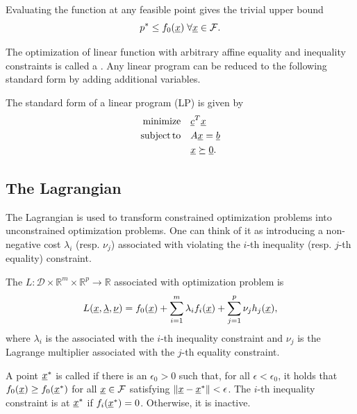 Evaluating the function at any feasible point gives the trivial upper bound
\[ p^* \leq f_0 (\underline{x}) \; \forall \underline{x}\in \mathcal{F}. \]

The optimization of linear function with arbitrary affine equality and inequality constraints is called a .
Any linear program can be reduced to the following standard form by adding additional variables.

\begin{definition}
The standard form of a linear program (LP) is given by
\begin{align*}
\mathrm{minimize} \quad & \underline{c}^T \underline{x} \\
\mathrm{subject\,to} \quad & A \underline{x} = \underline{b} \\
& \underline{x} \succeq \underline{0}.
\end{align*}
\end{definition}


\subsection{The Lagrangian}

The Lagrangian is used to transform constrained optimization problems into unconstrained optimization problems.
One can think of it as introducing a non-negative cost $\lambda_i$ (resp. $\nu_j$) associated with violating the $i$-th inequality (resp. $j$-th equality) constraint.

\begin{definition}
The  $L \colon \mathcal{D} \times \mathbb{R}^m \times \mathbb{R}^p \rightarrow \mathbb{R}$ associated with optimization problem is
\[ L(\underline{x},\underline{\lambda},\underline{\nu}) = f_0(\underline{x}) + \sum_{i=1}^m \lambda_i f_i(\underline{x}) + \sum_{j=1}^p \nu_j h_j(\underline{x}), \]
where $\lambda_i$ is the  associated with the $i$-th inequality constraint and $\nu_j$ is the Lagrange multiplier associated with the $j$-th equality constraint.
\end{definition}

\begin{definition}
A point $\underline{x}^*$ is called  if there is an $\epsilon_0 >0$ such that, for all $\epsilon< \epsilon_0$, it holds that $f_0 (\underline{x}) \geq f_0 (\underline{x}^*)$ for all $\underline{x} \in \mathcal{F}$ satisfying $\| \underline{x} - \underline{x}^* \| < \epsilon$.
The $i$-th inequality constraint is  at $\underline{x}^*$ if $f_i (\underline{x}^*)=0$.
Otherwise, it is inactive.
\end{definition}


